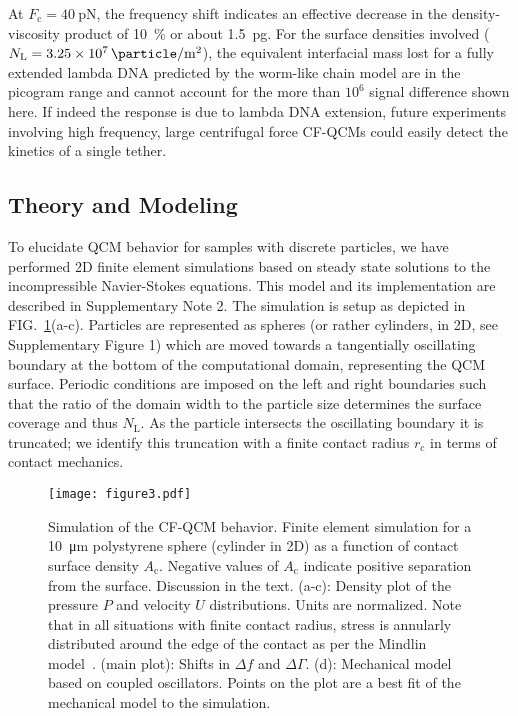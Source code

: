 \documentclass[floatfix,superscriptaddress,a4paper,twocolumn]{revtex4-1}
\newcommand{\Figure}[1]{FIG.~\ref{#1}}
\newcommand{\df}{\Delta\!f}
\newcommand{\dg}{\Delta\Gamma}
\newcommand{\todo}[1]{%
\textcolor{tangoorange}{#1}
}
\begin{document}
At $F_\mathrm{c}=\SI{40}{\pico\newton}$, the frequency shift indicates an
effective decrease in the density-viscosity product of \SI{10}{\percent} or
about \SI{1.5}{\pico\gram}.  For the surface densities involved
($N_\mathrm{L}=\SI{3.25e7}{\particle\per\meter\squared}$), the equivalent
interfacial mass lost for a fully extended lambda DNA predicted by the
worm-like chain model are in the picogram range and cannot account for the
more than $10^6$ signal difference shown here.  If indeed the response is
due to lambda DNA extension, future experiments involving high frequency,
large centrifugal force CF-QCMs could easily detect the kinetics of a
single tether.

\subsection*{Theory and Modeling}
\label{sec:theoryandmodeling}
To elucidate QCM behavior for samples with discrete particles, we have
performed 2D finite element simulations based on steady state solutions to
the incompressible Navier-Stokes equations.  This model and its
implementation are described in Supplementary Note 2.  The
simulation is setup as depicted in \mbox{\Figure{fig:lowersphere}(a-c)}.  Particles
are represented as spheres (or rather cylinders, in 2D, see Supplementary
Figure 1) which are moved
towards a tangentially oscillating boundary at the bottom of the
computational domain, representing the QCM surface.  Periodic conditions
are imposed on the left and right boundaries such that the ratio of the
domain width to the particle size determines the surface coverage and thus
$N_\mathrm{L}$.  As the particle intersects the oscillating boundary it is
truncated; we identify this truncation with a finite contact radius
$r_\mathrm{c}$ in terms of contact mechanics.
\begin{figure}[ht]
\centering
\texttt{[image: figure3.pdf]}
\caption{%
Simulation of the CF-QCM behavior.
Finite element simulation for a \SI{10}{\micro\meter} polystyrene
sphere (cylinder in 2D) as a function of contact surface density
$A_\mathrm{c}$.  Negative values of $A_\mathrm{c}$ indicate positive
separation from the surface.  Discussion in the text. (a-c): Density plot
of the pressure $P$ and velocity $U$ distributions. Units are normalized.
Note that in all situations with finite contact radius,
stress is annularly distributed around the edge of the contact as per the
Mindlin model~\cite{kumacheva1998interfacial}.
(main plot): Shifts in $\df$ and $\dg$.
(d): Mechanical model based on coupled oscillators. Points on the plot are
a best fit of the mechanical model to the simulation.}
\label{fig:lowersphere}
\end{figure}
\end{document}
